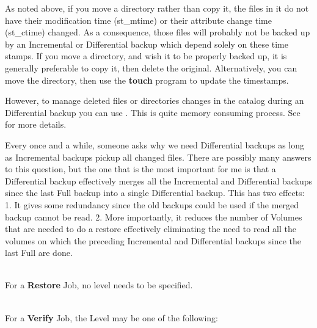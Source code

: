 {\begin{description}
\begin{description}
As noted above, if you move a directory rather than copy it, the
files in it do not have their modification time (st\_mtime) or
their attribute change time (st\_ctime) changed.  As a
consequence, those files will probably not be backed up by an
Incremental or Differential backup which depend solely on these
time stamps.  If you move a directory, and wish it to be
properly backed up, it is generally preferable to copy it, then
delete the original. Alternatively, you can move the directory, then
use the {\bf touch} program to update the timestamps.

However, to manage deleted files or directories changes in the
catalog during an Differential backup you can use .
This is quite memory consuming process. See  for more details.

Every once and a while, someone asks why we need Differential
backups as long as Incremental backups pickup all changed files.
There are possibly many answers to this question, but the one
that is the most important for me is that a Differential backup
effectively merges
all the Incremental and Differential backups since the last Full backup
into a single Differential backup.  This has two effects: 1.  It gives
some redundancy since the old backups could be used if the merged backup
cannot be read.  2.  More importantly, it reduces the number of Volumes
that are needed to do a restore effectively eliminating the need to read
all the volumes on which the preceding Incremental and Differential
backups since the last Full are done.

\end{description}

    \item [Restore] \hfill \\
        For a {\bf Restore} Job, no level needs to be specified.

    \item [Verify] \hfill \\
        For a {\bf Verify} Job, the Level may be one of the  following:

\begin{description}


\end{description}
\end{description}}
